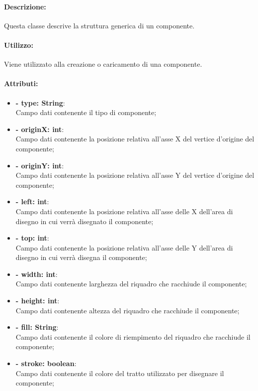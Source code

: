 	
	\paragraph{Descrizione:}
	Questa classe descrive la struttura generica di un componente.
	
	\paragraph{Utilizzo:}
	Viene utilizzato alla creazione o caricamento di una componente.
	
	\paragraph{Attributi:}
	\begin{itemize}
		\item \textbf{- type: String}:\\
			Campo dati contenente il tipo di componente;
		\item \textbf{- originX: int}:\\
			Campo dati contenente la posizione relativa all'asse X del vertice d'origine del componente;
		\item \textbf{- originY: int}:\\
			Campo dati contenente la posizione relativa all'asse Y del vertice d'origine del componente;
		\item \textbf{- left: int}:\\
			Campo dati contenente la posizione relativa all'asse delle X dell'area di disegno in cui verrà disegnato il componente;
		\item \textbf{- top: int}:\\
			Campo dati contenente la posizione relativa all'asse delle Y dell'area di disegno in cui verrà disegna il componente;
		\item \textbf{- width: int}:\\
			Campo dati contenente larghezza del riquadro che racchiude il componente;
		\item \textbf{- height: int}:\\
			Campo dati contenente altezza del riquadro che racchiude il componente;
		\item \textbf{- fill: String}:\\
			Campo dati contenente il colore di riempimento del riquadro che racchiude il componente;
		\item \textbf{- stroke: boolean}:\\
			Campo dati contenente il colore del tratto utilizzato per disegnare il componente;

\end{itemize}
